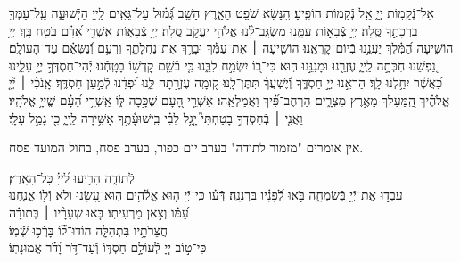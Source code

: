 \documentclass[twoside, openany, parskip=half, 11pt]{book}
\begin{document}
אֵל־נְֿקָמ֥וֹת יְיָ֑ אֵ֖ל נְֿקָמ֣וֹת הוֹפִֽיעַ׃ \hfill \break
הִ֭נָּשֵׂא שֹׁפֵ֣ט הָאָ֑רֶץ הָשֵׁ֥ב גְּֿ֝מ֗וּל עַל־גֵּאִֽים׃ \hfill \break
{} לַֽייָ֥ הַיְֿשׁוּעָ֑ה עַֽל־עַמְּךָ֖ בִרְכָתֶ֣ךָ סֶּֽלָה׃ \hfill \break
{} יְיָ֣ צְֿבָא֣וֹת עִמָּ֑נוּ מִשְׂגָּֽב־לָ֨נוּ אֱלֹהֵ֖י יַעֲקֹ֣ב סֶֽלָה׃ \hfill \break
{} יְיָ֥ צְֿבָא֑וֹת אַֽשְׁרֵ֥י אָ֝דָ֗ם בֹּטֵ֥חַ בָּֽךְ׃ \hfill \break
{} יְיָ֥ הוֹשִׁ֑יעָה הַ֝מֶּ֗לֶךְ יַעֲנֵ֥נוּ בְֿיוֹם־קׇרְאֵֽנוּ׃ \hfill \break
{}הוֹשִׁ֤יעָה ׀ אֶת־עַמֶּ֗ךָ וּבָרֵ֥ךְ אֶת־נַחֲלָתֶ֑ךָ וּֽרְעֵ֥ם וְֿ֝נַשְּׂאֵ֗ם עַד־הָעוֹלָֽם׃ \hfill \break
{}נַ֭פְשֵׁנוּ חִכְּתָ֣ה לַֽייָ֑ עֶזְרֵ֖נוּ וּמָגִנֵּ֣נוּ הֽוּא׃ \hfill \break
כִּי־ב֭וֹ יִשְׂמַ֣ח לִבֵּ֑נוּ כִּ֤י בְֿשֵׁ֖ם קׇדְשׁ֣וֹ בָטָֽחְֿנוּ׃ \hfill \break
יְֿהִי־חַסְדְּךָ֣ יְיָ֣ עָלֵ֑ינוּ כַּ֝אֲשֶׁ֗ר יִחַ֥לְנוּ לָֽךְ׃ \hfill \break
{}הַרְאֵ֣נוּ יְיָ֣ חַסְדֶּ֑ךָ וְֿ֝יֶשְׁעֲךָ֗ תִּתֶּן־לָֽנוּ׃ \hfill \break
{}ק֭וּמָֽה עֶזְרָ֣תָה לָּ֑נוּ וּ֝פְדֵ֗נוּ לְֿמַ֣עַן חַסְדֶּֽךָ׃ \hfill \break
{}אָֽנֹכִ֨י ׀ יְ֘יָ֤ אֱלֹהֶ֗יךָ הַֽ֭מַּעַלְךָ מֵאֶ֣רֶץ מִצְרָ֑יִם הַרְחֶב־פִּ֗֝יךָ וַאֲמַלְאֵֽהוּ׃ \hfill \break
{}אַשְׁרֵ֣י הָ֭עָם שֶׁכָּ֣כָה לּ֑וֹ אַֽשְׁרֵ֥י הָ֝עָ֗ם שֱׁייָ֥ אֱלֹהָֽיו׃ \hfill \break
{}וַאֲנִ֤י ׀ בְּֿחַסְדְּךָ֣ בָטַחְתִּי֮ יָ֤גֵ֥ל לִבִּ֗י בִּֽישׁוּעָ֫תֶ֥ךָ אָשִׁ֥ירָה לַֽייָ֑ כִּ֖י גָמַ֣ל עָלָֽי׃ \hfill \break

\negline

\begin{narrow}
\begin{scriptsize} %
\textsf{
אין אומרים "מזמור לתודה" בערב יום כפור, בערב פסח, בחול המועד פסח.\\
}\end{scriptsize}
 לְֿתוֹדָ֑ה \hfill
הָרִ֥יעוּ לַ֝ייָ֗ כׇּל־הָאָֽרֶץ׃\\
עִבְד֣וּ אֶת־יְֿיָ֣ בְּֿשִׂמְחָ֑ה \hfill בֹּ֥אוּ לְֿ֝פָנָ֗יו בִּרְנָנָֽה׃
דְּֿע֗וּ כִּֽי־יְֿיָ ה֤וּא אֱלֹ֫הִ֥ים \hfill הֽוּא־עָ֭שָׂנוּ ולא וְֿל֣וֹ אֲנַ֑חְנוּ\\ עַ֝מּ֗וֹ וְֿצֹ֣אן מַרְעִיתֽוֹ׃ \hfill
בֹּ֤אוּ שְֿׁעָרָ֨יו ׀ בְּֿתוֹדָ֗ה \\ חֲצֵרֹתָ֥יו בִּתְהִלָּ֑ה \hfill הוֹדוּ־ל֗֝וֹ בָּרְֿכ֥וּ שְֿׁמֽוֹ׃\\
כִּי־ט֣וֹב יְיָ֭ לְֿעוֹלָ֣ם חַסְדּ֑וֹ \hfill וְֿעַד־דֹּ֥ר וָ֝דֹ֗ר אֱמוּנָתֽוֹ׃
\end{narrow}
\end{document}
